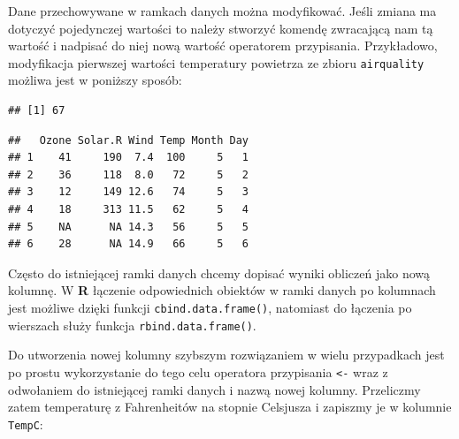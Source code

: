 \documentclass[]{book}
\newenvironment{Shaded}{\begin{snugshade}}{\end{snugshade}}
\newcommand{\KeywordTok}[1]{\textcolor[rgb]{0.13,0.29,0.53}{\textbf{#1}}}
\newcommand{\DecValTok}[1]{\textcolor[rgb]{0.00,0.00,0.81}{#1}}
\newcommand{\StringTok}[1]{\textcolor[rgb]{0.31,0.60,0.02}{#1}}
\newcommand{\CommentTok}[1]{\textcolor[rgb]{0.56,0.35,0.01}{\textit{#1}}}
\newcommand{\OperatorTok}[1]{\textcolor[rgb]{0.81,0.36,0.00}{\textbf{#1}}}
\newcommand{\NormalTok}[1]{#1}
\theoremstyle{definition}
\theoremstyle{definition}
\theoremstyle{definition}
\theoremstyle{remark}
\begin{document}
Dane przechowywane w ramkach danych można modyfikować. Jeśli zmiana ma
dotyczyć pojedynczej wartości to należy stworzyć komendę zwracającą nam
tą wartość i nadpisać do niej nową wartość operatorem przypisania.
Przykładowo, modyfikacja pierwszej wartości temperatury powietrza ze
zbioru \texttt{airquality} możliwa jest w poniższy sposób:

\begin{Shaded}
\end{Shaded}

\begin{verbatim}
## [1] 67
\end{verbatim}

\begin{Shaded}
\end{Shaded}

\begin{verbatim}
##   Ozone Solar.R Wind Temp Month Day
## 1    41     190  7.4  100     5   1
## 2    36     118  8.0   72     5   2
## 3    12     149 12.6   74     5   3
## 4    18     313 11.5   62     5   4
## 5    NA      NA 14.3   56     5   5
## 6    28      NA 14.9   66     5   6
\end{verbatim}

Często do istniejącej ramki danych chcemy dopisać wyniki obliczeń jako
nową kolumnę. W \textbf{R} łączenie odpowiednich obiektów w ramki danych
po kolumnach jest możliwe dzięki funkcji \texttt{cbind.data.frame()},
natomiast do łączenia po wierszach służy funkcja
\texttt{rbind.data.frame()}.

Do utworzenia nowej kolumny szybszym rozwiązaniem w wielu przypadkach
jest po prostu wykorzystanie do tego celu operatora przypisania
\texttt{\textless{}-} wraz z odwołaniem do istniejącej ramki danych i
nazwą nowej kolumny. Przeliczmy zatem temperaturę z Fahrenheitów na
stopnie Celsjusza i zapiszmy je w kolumnie \texttt{TempC}:

\begin{Shaded}
\end{Shaded}
\end{document}
